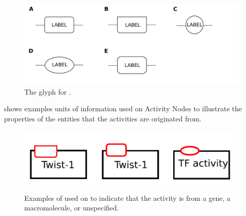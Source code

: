 \begin{figure}[H]
  \centering
  \includegraphics[scale = 0.2]{images/unitInformation}
  \caption{The \AF glyph for .}
  \label{fig:af:unitInfo}
\end{figure}

 shows examples units of information used on Activity Nodes to illustrate the properties of the entities that the activities are originated from.

\begin{figure}[H]
  \centering
  \includegraphics[scale = 0.5]{examples/unitofinformation}
  \caption{Examples of  used on  to indicate that the activity is from a gene, a macromolecule, or unspecified.}
  \label{fig:af:unitofinfo}
\end{figure}
